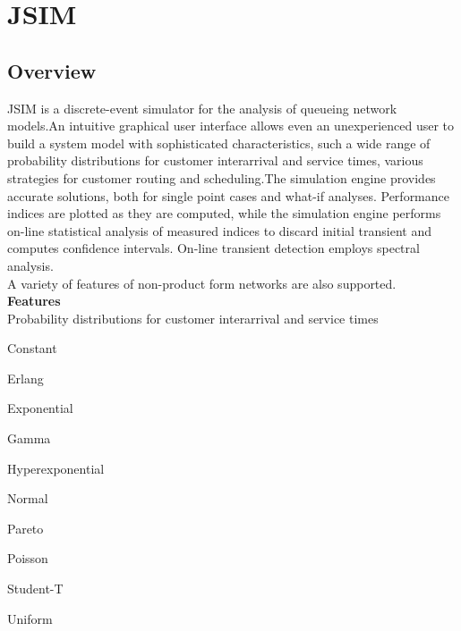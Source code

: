 %
%
%
%
%
\chapter{JSIM}
\label{cha:jsim}
\section{Overview}
JSIM is a discrete-event simulator for the analysis of queueing network models.An intuitive graphical user interface allows even an unexperienced user to 
build a system model with sophisticated characteristics, such a wide range of probability distributions for customer interarrival and service times,
various strategies for customer routing and scheduling.The simulation engine provides accurate solutions, both for single point cases and what-if analyses.
Performance indices are plotted as they are computed, while the simulation engine performs on-line statistical analysis of measured indices to discard initial transient and computes confidence intervals. On-line transient detection employs spectral analysis.\\

\noindent A variety of features of non-product form networks are also supported.\\

\noindent \textbf{\large Features}\\

\noindent Probability distributions for customer interarrival and service times 
\begin{itemize*}
	\item Constant
	\item Erlang
	\item Exponential
	\item Gamma
	\item Hyperexponential
	\item Normal 
	\item Pareto
	\item Poisson
	\item Student-T
	\item Uniform
\end{itemize*}

